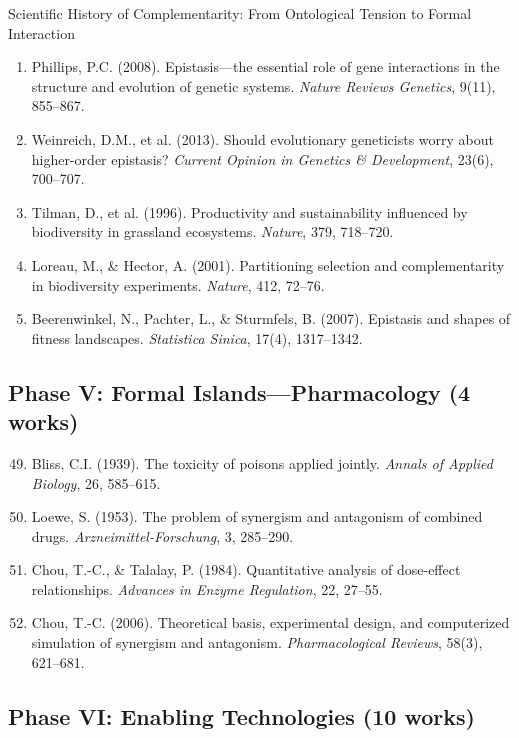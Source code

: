 \begin{chapter}{Scientific History of Complementarity: From Ontological Tension to Formal Interaction}
\begin{enumerate}
    \item Phillips, P.C. (2008). Epistasis---the essential role of gene interactions in the structure and evolution of genetic systems. \textit{Nature Reviews Genetics}, 9(11), 855--867.

    \item Weinreich, D.M., et al. (2013). Should evolutionary geneticists worry about higher-order epistasis? \textit{Current Opinion in Genetics \& Development}, 23(6), 700--707.

    \item Tilman, D., et al. (1996). Productivity and sustainability influenced by biodiversity in grassland ecosystems. \textit{Nature}, 379, 718--720.

    \item Loreau, M., \& Hector, A. (2001). Partitioning selection and complementarity in biodiversity experiments. \textit{Nature}, 412, 72--76.

    \item Beerenwinkel, N., Pachter, L., \& Sturmfels, B. (2007). Epistasis and shapes of fitness landscapes. \textit{Statistica Sinica}, 17(4), 1317--1342.
\end{enumerate}

\subsection{Phase V: Formal Islands---Pharmacology (4 works)}

\begin{enumerate}
    \setcounter{enumi}{48}
    \item Bliss, C.I. (1939). The toxicity of poisons applied jointly. \textit{Annals of Applied Biology}, 26, 585--615.

    \item Loewe, S. (1953). The problem of synergism and antagonism of combined drugs. \textit{Arzneimittel-Forschung}, 3, 285--290.

    \item Chou, T.-C., \& Talalay, P. (1984). Quantitative analysis of dose-effect relationships. \textit{Advances in Enzyme Regulation}, 22, 27--55.

    \item Chou, T.-C. (2006). Theoretical basis, experimental design, and computerized simulation of synergism and antagonism. \textit{Pharmacological Reviews}, 58(3), 621--681.
\end{enumerate}

\subsection{Phase VI: Enabling Technologies (10 works)}


\end{chapter}
